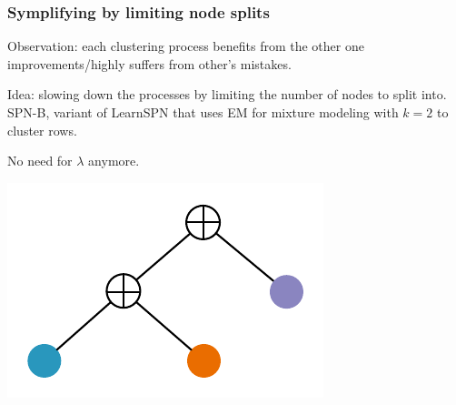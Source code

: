\documentclass[xcolor={usenames,dvipsnames,svgnames}, compress]{beamer}
\begin{document}
\begin{frame}
  \frametitle{Symplifying by limiting node splits}
  \footnotesize

  Observation: each clustering process benefits from the other one improvements/highly suffers
  from other's mistakes.\par\bigskip

  Idea: slowing down the processes by limiting the number of
  nodes to split into. \textsf{SPN-B}, variant of \textsf{LearnSPN} that uses EM
  for mixture modeling with
  $k=2$ to cluster rows.

  No need for $\lambda$ anymore.\par\bigskip

  \hspace{-5pt}\begin{minipage}[t]{0.3\linewidth}
    \begin{center}
      \includegraphics[width=0.9\linewidth]{figures/learnspn-4.pdf}
    \end{center}
  \end{minipage}
\end{frame}
\end{document}
